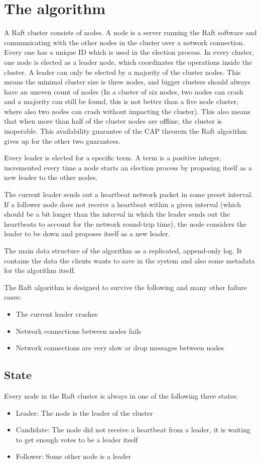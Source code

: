 \section{The algorithm}
A Raft cluster consists of nodes. A node is a server running the Raft software and communicating with the other nodes in the cluster over a network connection.
Every one has a unique ID which is used in the election process. In every cluster, one node is elected as a leader node, which coordinates the operations inside the cluster. A leader can only be elected by
a majority of the cluster nodes. This means the minimal cluster size is three nodes, and bigger clusters should always have an uneven count of nodes (In a cluster
of six nodes, two nodes can crash and a majority can still be found, this is not better than a five node cluster, where also two nodes can crash without impacting the cluster).
This also means that when more than half of the cluster nodes are offline, the cluster is inoperable.
This availability guarantee of the CAP theorem the Raft algorithm gives up for the other two guarantees.

Every leader is elected for a specific term. A term is a positive integer, incremented every time a node starts an election process by proposing itself as a new leader to the other nodes.

The current leader sends out a heartbeat network packet in some preset interval. If a follower node does not receive a heartbeat within a given interval (which should be a bit longer than the interval in which the leader sends out the heartbeats to account for the network round-trip time), the node considers the leader to be down and proposes itself as a new leader.

The main data structure of the algorithm as a replicated, append-only log. It contains the data the clients wants to save in the system and also some metadata
for the algorithm itself.

The Raft algorithm is designed to survive the following and many other failure cases:
\begin{itemize}
    \item The current leader crashes
    \item Network connections between nodes fails
    \item Network connections are very slow or drop messages between nodes
\end{itemize}

\subsection{State}
Every node in the Raft cluster is always in one of the following three states:
\begin{itemize}
    \item Leader: The node is the leader of the cluster
    \item Candidate: The node did not receive a heartbeat from a leader, it is waiting to get enough votes to be a leader itself
    \item Follower: Some other node is a leader
\end{itemize}


